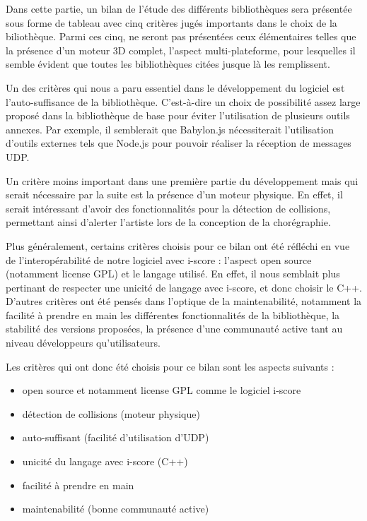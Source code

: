 Dans cette partie, un bilan de l'étude des différents bibliothèques sera présentée sous forme de tableau avec cinq critères jugés importants dans le choix de la biliothèque. Parmi ces cinq, ne seront pas présentées ceux élémentaires telles que la présence d'un moteur 3D complet, l'aspect multi-plateforme, pour lesquelles il semble évident que toutes les bibliothèques citées jusque là les remplissent.

Un des critères qui nous a paru essentiel dans le développement du logiciel est l'auto-suffisance de la bibliothèque. C'est-à-dire un choix de possibilité assez large proposé dans la bibliothèque de base pour éviter l'utilisation de plusieurs outils annexes. Par exemple, il semblerait que Babylon.js nécessiterait l'utilisation d'outils externes tels que Node.js pour pouvoir réaliser la réception de messages UDP. 

Un critère moins important dans une première partie du développement mais qui serait nécessaire par la suite est la présence d'un moteur physique. En effet, il serait intéressant d'avoir des fonctionnalités pour la détection de collisions, permettant ainsi d'alerter l'artiste lors de la conception de la chorégraphie.

Plus généralement, certains critères choisis pour ce bilan ont été réfléchi en vue de l'interopérabilité de notre logiciel avec i-score : l'aspect open source (notamment license GPL) et le langage utilisé. En effet, il nous semblait plus pertinant de respecter une unicité de langage avec i-score, et donc choisir le C++. 
D'autres critères ont été pensés dans l'optique de la maintenabilité, notamment la facilité à prendre en main les différentes fonctionnalités de la bibliothèque, la stabilité des versions proposées, la présence d'une communauté active tant au niveau développeurs qu'utilisateurs.



Les critères qui ont donc été choisis pour ce bilan sont les aspects suivants : 
\begin{itemize}
\item open source et notamment license GPL comme le logiciel i-score 
\item détection de collisions (moteur physique)
\item auto-suffisant (facilité d'utilisation d'UDP)
\item unicité du langage avec i-score (C++)
\item facilité à prendre en main
\item maintenabilité (bonne communauté active)
\end{itemize} 
 

